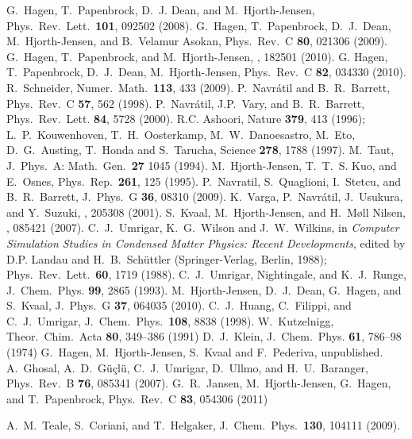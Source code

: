 \begin{thebibliography}{200}
 G.~Hagen, T.~Papenbrock, D.~J. Dean, and M.~Hjorth-Jensen, 
Phys.~Rev.~Lett.~{\bf 101}, 092502 (2008).
 G.~Hagen, T.~Papenbrock, D.~J.~Dean, M.~Hjorth-Jensen, and B.~Velamur Asokan, Phys.~Rev.~C {\bf 80}, 021306 (2009).
  G.~Hagen, T.~Papenbrock, and M.~Hjorth-Jensen, , 182501 (2010). 
  G. Hagen, T.~Papenbrock, D.~J.~Dean, M.~Hjorth-Jensen, Phys.~Rev.~C {\bf 82}, 034330 (2010).
  R.~Schneider, Numer.~Math.~{\bf 113}, 433 (2009). 
 P.~Navr\'atil and B.~R.~Barrett, Phys.~Rev.~C \textbf{57}, 562 (1998).
 P.~Navr\'atil, J.P.~Vary, and B.~R.~Barrett, 
Phys.~Rev.~Lett. \textbf{84}, 5728 (2000).
 R.C. Ashoori, Nature {\bf 379}, 413 (1996);
L.~P.~Kouwenhoven, T.~H.~Oosterkamp, M.~W.~Danoesastro, M.~Eto, D.~G.~Austing,
T.~Honda and S.~Tarucha, Science {\bf 278}, 1788 (1997).
 M.~Taut, J.~Phys.~A: Math.~Gen.~{\bf 27} 1045 (1994).
 M.~Hjorth-Jensen, T.~T.~S. Kuo, and E.~Osnes, Phys.~Rep.~{\bf 261}, 125 (1995).
   P.~Navratil, S.~Quaglioni, I.~Stetcu, and B.~R.~Barrett, J.~Phys.~G {\bf 36}, 08310 (2009).
 K.~Varga, P.~Navr\'atil, J.~Usukura, and Y.~Suzuki, , 205308 (2001).
 S.~Kvaal, M.~Hjorth-Jensen, and H.~M\o ll Nilsen, , 085421 (2007).
 C.~J.~Umrigar, K.~G.~Wilson and J.~W.~Wilkins, in {\it Computer
Simulation Studies in Condensed Matter Physics: Recent Developments},
edited by D.P. Landau and H.~B.~Sch\"uttler (Springer-Verlag, Berlin, 1988);
Phys.~Rev.~Lett.~{\bf 60}, 1719 (1988).
 C.~J.~Umrigar, Nightingale, and K.~J.~Runge, J.~Chem.~Phys.
{\bf 99}, 2865 (1993).
 M.~Hjorth-Jensen, D.~J.~Dean, G.~Hagen, and S.~Kvaal, J.~Phys.~G {\bf 37}, 064035 (2010).
 C.~J.~Huang, C.~Filippi, and C.~J.~Umrigar, J.~Chem.~Phys.~{\bf 108},
8838 (1998).
 W.~Kutzelnigg, Theor.~Chim.~Acta {\bf 80}, 349--386 (1991)
 D.~J.~Klein, J.~Chem.~Phys. {\bf  61}, 786--98 (1974)
 G.~Hagen, M.~Hjorth-Jensen, S.~Kvaal and F.~Pederiva, unpublished.
 A.~Ghosal, A.~D.~G\"{u}\c{c}l\"{u}, C.~J.~Umrigar, D.~Ullmo, and H.~U.~Baranger, Phys.~Rev.~B
{\bf 76}, 085341 (2007).
 G.~R.~Jansen, M.~Hjorth-Jensen, G.~Hagen, and T.~Papenbrock, 
Phys.~Rev.~C {\bf 83},  054306 (2011)


  A.~M.~Teale, S.~Coriani, and T.~Helgaker, J.~Chem.~Phys.~{\bf 130},
104111 (2009).


\end{thebibliography}








